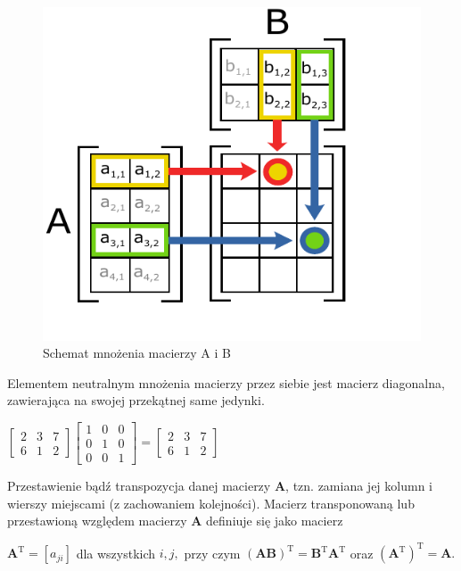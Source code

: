 \documentclass[a4paper,12pt,oneside]{book}
\begin{document}
	\begin{figure}[h!]
		\centering
		\includegraphics[scale=0.8]{Matrix_multiplication_diagram_2.pdf}
		\caption{Schemat mnożenia macierzy A i B}
	\end{figure}

	Elementem neutralnym mnożenia macierzy przez siebie jest macierz diagonalna, zawierająca na swojej przekątnej same jedynki.
			\begin{center}
		$\begin{bmatrix}
			2 & 3 & 7 \\
			6 & 1 & 2 
		\end{bmatrix} 
		\begin{bmatrix}
			1 & 0 & 0 \\
			0 & 1 & 0\\
			0 & 0 & 1 
		\end{bmatrix} = 
		\begin{bmatrix}
			2 & 3 & 7 \\
			6 & 1 & 2 
		\end{bmatrix}$ 
	\end{center}

	Przestawienie bądź transpozycja danej macierzy $\mathbf {A}$, tzn. zamiana jej kolumn i wierszy miejscami (z zachowaniem kolejności). Macierz transponowaną lub przestawioną względem macierzy $\mathbf  A$ definiuje się jako macierz
	
	$\mathbf {A} ^{\mathrm {T} }=[a_{ji}]$ dla wszystkich $i,j,$ przy czym $(\mathbf {AB} )^{\mathrm {T} }=\mathbf {B} ^{\mathrm {T} }\mathbf {A} ^{\mathrm {T} }$ oraz $\left(\mathbf {A} ^{\mathrm {T} }\right)^{\mathrm {T} }=\mathbf {A} .$\\
	
\end{document}
